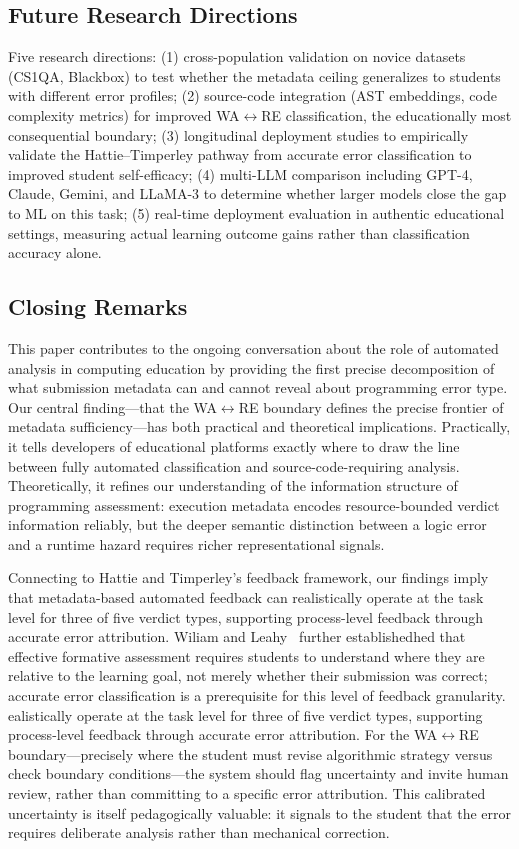 \documentclass[acmsmall]{acmart}
\begin{document}
\subsection*{Future Research Directions}
Five research directions: (1) cross-population validation on novice datasets
(CS1QA\cite{lee2022cs1qa}, Blackbox) to test whether the metadata ceiling generalizes to
students with different error profiles; (2) source-code integration (AST
embeddings, code complexity metrics) for improved WA$\leftrightarrow$RE
classification, the educationally most consequential boundary; (3) longitudinal
deployment studies to empirically validate the Hattie--Timperley pathway from
accurate error classification to improved student self-efficacy; (4) multi-LLM
comparison including GPT-4, Claude, Gemini, and LLaMA-3 to determine whether
larger models close the gap to ML on this task; (5) real-time deployment
evaluation in authentic educational settings, measuring actual learning outcome
gains rather than classification accuracy alone.

\subsection*{Closing Remarks}

This paper contributes to the ongoing conversation about the role of automated
analysis in computing education by providing the first precise decomposition of
what submission metadata can and cannot reveal about programming error type.
Our central finding---that the WA$\leftrightarrow$RE boundary defines the
precise frontier of metadata sufficiency---has both practical and theoretical
implications. Practically, it tells developers of educational platforms exactly
where to draw the line between fully automated classification and
source-code-requiring analysis. Theoretically, it refines our understanding of
the information structure of programming assessment: execution metadata encodes
resource-bounded verdict information reliably, but the deeper semantic distinction
between a logic error and a runtime hazard requires richer representational
signals.

Connecting to Hattie and Timperley's feedback framework, our findings imply
that metadata-based automated feedback can realistically operate at the task level for three of five verdict types,
supporting process-level feedback through accurate error attribution.
Wiliam and Leahy~\cite{wiliam2011assessment} further establishedhed that effective formative assessment requires students to understand where they are relative to the learning goal, not merely whether their submission was correct; accurate error classification is a prerequisite for this level of feedback granularity. ealistically operate at the task
level for three of five verdict types, supporting process-level feedback through
accurate error attribution. For the WA$\leftrightarrow$RE boundary---precisely
where the student must revise algorithmic strategy versus check boundary
conditions---the system should flag uncertainty and invite human review, rather
than committing to a specific error attribution. This calibrated uncertainty
is itself pedagogically valuable: it signals to the student that the error
requires deliberate analysis rather than mechanical correction.
\end{document}
